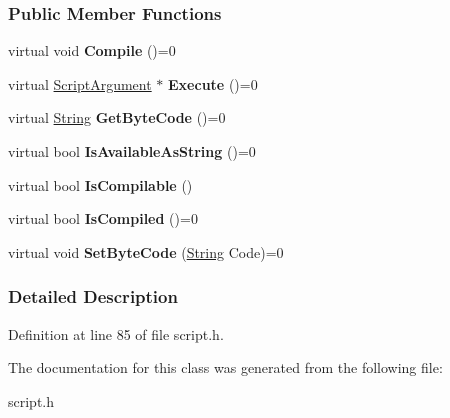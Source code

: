 \subsubsection*{Public Member Functions}
\begin{DoxyCompactItemize}
\item 
\hypertarget{classMezzanine_1_1Scripting_1_1ScriptCompilable_a6681e2c2d8c01e3eb04e2b7472f7dd0c}{
virtual void {\bfseries Compile} ()=0}
\label{classMezzanine_1_1Scripting_1_1ScriptCompilable_a6681e2c2d8c01e3eb04e2b7472f7dd0c}

\item 
\hypertarget{classMezzanine_1_1Scripting_1_1ScriptCompilable_a5d9ea01e59655f6357524ad37fca0f6f}{
virtual \hyperlink{classMezzanine_1_1Scripting_1_1ScriptArgument}{ScriptArgument} $\ast$ {\bfseries Execute} ()=0}
\label{classMezzanine_1_1Scripting_1_1ScriptCompilable_a5d9ea01e59655f6357524ad37fca0f6f}

\item 
\hypertarget{classMezzanine_1_1Scripting_1_1ScriptCompilable_a7c0f68ed0deb1136e1e374cd842e152e}{
virtual \hyperlink{namespaceMezzanine_acf9fcc130e6ebf08e3d8491aebcf1c86}{String} {\bfseries GetByteCode} ()=0}
\label{classMezzanine_1_1Scripting_1_1ScriptCompilable_a7c0f68ed0deb1136e1e374cd842e152e}

\item 
\hypertarget{classMezzanine_1_1Scripting_1_1ScriptCompilable_ac81f66d0d71776b7cb153627f587d69a}{
virtual bool {\bfseries IsAvailableAsString} ()=0}
\label{classMezzanine_1_1Scripting_1_1ScriptCompilable_ac81f66d0d71776b7cb153627f587d69a}

\item 
\hypertarget{classMezzanine_1_1Scripting_1_1ScriptCompilable_a0f8769ae4360f309c998564ebfa82524}{
virtual bool {\bfseries IsCompilable} ()}
\label{classMezzanine_1_1Scripting_1_1ScriptCompilable_a0f8769ae4360f309c998564ebfa82524}

\item 
\hypertarget{classMezzanine_1_1Scripting_1_1ScriptCompilable_a82542559d222aa021ad3d37af12c8063}{
virtual bool {\bfseries IsCompiled} ()=0}
\label{classMezzanine_1_1Scripting_1_1ScriptCompilable_a82542559d222aa021ad3d37af12c8063}

\item 
\hypertarget{classMezzanine_1_1Scripting_1_1ScriptCompilable_a5c97eaa5a76225709e94c392ac49e4a6}{
virtual void {\bfseries SetByteCode} (\hyperlink{namespaceMezzanine_acf9fcc130e6ebf08e3d8491aebcf1c86}{String} Code)=0}
\label{classMezzanine_1_1Scripting_1_1ScriptCompilable_a5c97eaa5a76225709e94c392ac49e4a6}

\end{DoxyCompactItemize}


\subsubsection{Detailed Description}


Definition at line 85 of file script.h.



The documentation for this class was generated from the following file:\begin{DoxyCompactItemize}
\item 
script.h\end{DoxyCompactItemize}

